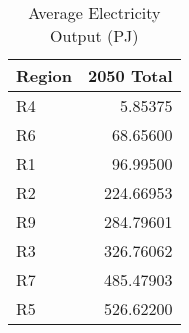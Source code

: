 \documentclass[border=1mm, preview]{standalone}
\begin{document}
\begin{table}[!h]

\caption{\label{tab:unnamed-chunk-8}Average Electricity Output (PJ)}
\centering
\begin{tabular}{lr}
\toprule
Region & 2050 Total\\
\midrule
\rowcolor{gray!6}  R4 & 5.85375\\
R6 & 68.65600\\
\rowcolor{gray!6}  R1 & 96.99500\\
R2 & 224.66953\\
\rowcolor{gray!6}  R9 & 284.79601\\
R3 & 326.76062\\
\rowcolor{gray!6}  R7 & 485.47903\\
R5 & 526.62200\\
\bottomrule
\end{tabular}
\end{table}
\end{document}

